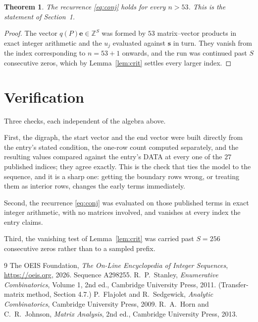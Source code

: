 \documentclass[11pt,a4paper]{article}
\theoremstyle{plain}
\newtheorem{theorem}{Theorem}
\theoremstyle{definition}
\begin{document}
\begin{theorem}
The recurrence \eqref{eq:conj} holds for every $n>53$. This is the statement of
Section~1.
\end{theorem}

\begin{proof}
The vector $q(P)\mathbf{e}\in\mathbb{Z}^{S}$ was formed by $53$ matrix--vector
products in exact integer arithmetic and the $u_j$ evaluated against $\mathbf{s}$ in turn.
They vanish from the index corresponding to $n=53+1$ onwards, and the run was continued
past $S$ consecutive zeros, which by Lemma~\ref{lem:crit} settles every larger index.
\end{proof}

\section{Verification}

Three checks, each independent of the algebra above.

First, the digraph, the start vector and the end vector were built directly from the
entry's stated condition, the one-row count computed separately, and the resulting values
compared against the entry's DATA at every one of the $27$ published indices; they
agree exactly. This is the check that ties the model to the sequence, and it is a sharp one:
getting the boundary rows wrong, or treating them as interior rows, changes the early terms
immediately.

Second, the recurrence \eqref{eq:conj} was evaluated on those published terms in exact
integer arithmetic, with no matrices involved, and vanishes at every index the entry claims.

Third, the vanishing test of Lemma~\ref{lem:crit} was carried past $S=256$ consecutive
zeros rather than to a sampled prefix.

\begin{thebibliography}{9}
 The OEIS Foundation, \emph{The On-Line Encyclopedia of Integer
Sequences}, \url{https://oeis.org}, 2026. Sequence A298255.
 R.~P.~Stanley, \emph{Enumerative Combinatorics}, Volume 1, 2nd ed.,
Cambridge University Press, 2011. (Transfer-matrix method, Section 4.7.)
 P.~Flajolet and R.~Sedgewick, \emph{Analytic Combinatorics}, Cambridge
University Press, 2009.
 R.~A.~Horn and C.~R.~Johnson, \emph{Matrix Analysis}, 2nd ed., Cambridge
University Press, 2013.
\end{thebibliography}
\end{document}
